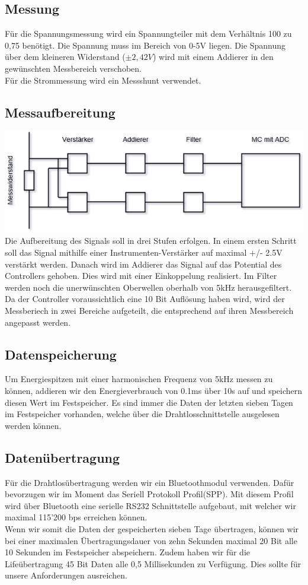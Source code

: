 \documentclass[12pt,a4paper]{article}
\begin{document}
\subsection{Messung}
Für die Spannungsmessung wird ein Spannungteiler mit dem Verhältnis 100 zu 0,75 benötigt. Die Spannung muss im Bereich von 0-5V liegen. Die Spannung über dem kleineren Widerstand ($\pm 2,42V$) wird mit einem Addierer in den gewünschten Messbereich verschoben.\\
Für die Strommessung wird ein Messshunt verwendet.
\subsection{Messaufbereitung}
\includegraphics[scale=0.9]{Block-Messung.png}\\
Die Aufbereitung des Signals soll in drei Stufen erfolgen. In einem ersten Schritt soll das Signal mithilfe einer Instrumenten-Verstärker auf maximal +/- 2.5V verstärkt werden. Danach wird im Addierer das Signal auf das Potential des Controllers gehoben. Dies wird mit einer Einkoppelung realisiert. Im Filter werden noch die unerwünschten Oberwellen oberhalb von 5kHz herausgefiltert. Da der Controller voraussichtlich eine 10 Bit Auflösung haben wird, wird der Messberiech in zwei Bereiche aufgeteilt, die entsprechend auf ihren Messbereich angepasst werden.
\subsection{Datenspeicherung}
Um Energiespitzen mit einer harmonischen Frequenz von 5kHz messen zu können, addieren wir den Energieverbrauch von 0.1ms über 10s auf und speichern diesen Wert im Festspeicher. Es sind immer die Daten der letzten sieben Tagen im Festspeicher vorhanden, welche über die Drahtlosschnittstelle ausgelesen werden können.

\subsection{Datenübertragung}
Für die Drahtlosübertragung werden wir ein Bluetoothmodul verwenden. Dafür bevorzugen wir im Moment das \glqq Seriell Protokoll Profil\grqq(SPP). Mit diesem Profil wird über Bluetooth eine serielle RS232 Schnittstelle aufgebaut, mit welcher wir maximal 115'200 bps erreichen können.\\ 
Wenn wir somit die Daten der gespeicherten sieben Tage übertragen, können wir bei einer maximalen Übertragungsdauer von zehn Sekunden maximal 20 Bit alle 10 Sekunden im Festspeicher abspeichern. Zudem haben wir für die Lifeübertragung 45 Bit Daten alle 0,5 Millisekunden zu Verfügung. Dies sollte für unsere Anforderungen ausreichen.
\end{document}
